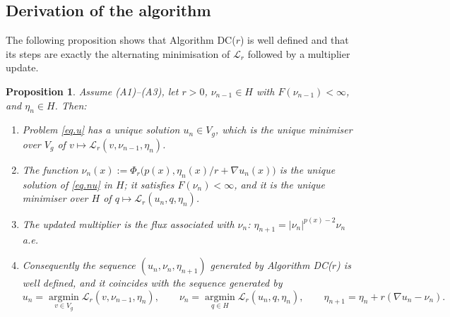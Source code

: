 \documentclass[11pt]{amsart}
\newcommand{\LL}{\mathcal L}
\newtheorem{prop}[teo]{Proposition}
\theoremstyle{definition}
\theoremstyle{remark}
\numberwithin{equation}{section}
\begin{document}
\subsection{Derivation of the algorithm}
The following proposition shows that Algorithm DC($r$) is well defined and that its steps are exactly the alternating minimisation of $\LL_r$ followed by a multiplier update.

\begin{prop}\label{prop.derivation}
Assume (A1)--(A3), let $r>0$, $\nu_{n-1}\in H$ with $F(\nu_{n-1})<\infty$, and $\eta_n\in H$. Then:
\begin{enumerate}
\item[(a)] Problem \eqref{eq.u} has a unique solution $u_n\in V_g$, which is the unique minimiser over $V_g$ of $v\mapsto\LL_r(v,\nu_{n-1},\eta_n)$.
\item[(b)] The function $\nu_n(x):=\Phi_r\big(p(x),\eta_n(x)/r+\nabla u_n(x)\big)$ is the unique solution of \eqref{eq.nu} in $H$; it satisfies $F(\nu_n)<\infty$, and it is the unique minimiser over $H$ of $q\mapsto\LL_r(u_n,q,\eta_n)$.
\item[(c)] The updated multiplier is the flux associated with $\nu_n$: $\eta_{n+1}=|\nu_n|^{p(x)-2}\nu_n$ a.e.
\item[(d)] Consequently the sequence $(u_n,\nu_n,\eta_{n+1})$ generated by Algorithm DC($r$) is well defined, and it coincides with the sequence generated by
\begin{equation}\label{eq.alg2}
u_n=\operatorname*{argmin}_{v\in V_g}\LL_r(v,\nu_{n-1},\eta_n),\qquad
\nu_n=\operatorname*{argmin}_{q\in H}\LL_r(u_n,q,\eta_n),\qquad
\eta_{n+1}=\eta_n+r(\nabla u_n-\nu_n).
\end{equation}
\end{enumerate}
\end{prop}
\end{document}
